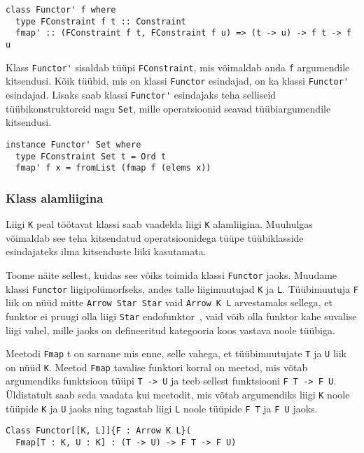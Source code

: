 \documentclass[12pt]{article}
\begin{document}
        \begin{verbatim}class Functor' f where
  type FConstraint f t :: Constraint
  fmap' :: (FConstraint f t, FConstraint f u) => (t -> u) -> f t -> f u\end{verbatim}

        Klass \verb!Functor'! sisaldab tüüpi \verb!FConstraint!, mis võimaldab anda \verb!f! argumendile kitsendusi. Kõik tüübid, mis on klassi \verb!Functor! esindajad, on ka klassi \verb!Functor'! esindajad. Lisaks saab klassi \verb!Functor'! esindajaks teha selliseid tüübikonstruktoreid nagu \verb!Set!, mille operatsioonid seavad tüübiargumendile kitsendusi.

        \begin{verbatim}instance Functor' Set where
  type FConstraint Set t = Ord t
  fmap' f x = fromList (fmap f (elems x))\end{verbatim}
      \subsubsection{Klass alamliigina}
        Liigi \verb!K! peal töötavat klassi saab vaadelda liigi \verb!K! alamliigina. Muuhulgas võimaldab see teha kitsendatud operatsioonidega tüüpe tüübiklasside esindajateks ilma kitsenduste liiki kasutamata.

        Toome näite sellest, kuidas see võiks toimida klassi \verb!Functor! jaoks. Muudame klassi \verb!Functor! liigipolümorfseks, andes talle liigimuutujad \verb!K! ja \verb!L!. Tüübimuutuja \verb!F! liik on nüüd mitte \verb!Arrow Star Star! vaid \verb!Arrow K L! arvestamaks sellega, et funktor ei pruugi olla liigi \verb!Star! endofunktor~\cite{Cat}, vaid võib olla funktor kahe suvalise liigi vahel, mille jaoks on defineeritud kategooria koos vastava noole tüübiga.

        Meetodi \verb!Fmap! t on sarnane mis enne, selle vahega, et tüübimuutujate \verb!T! ja \verb!U! liik on nüüd \verb!K!. Meetod \verb!Fmap! tavalise funktori korral on meetod, mis võtab argumendiks funktsioon tüüpi \verb!T -> U! ja teeb sellest funktsiooni \verb!F T -> F U!. Üldistatult saab seda vaadata kui meetodit, mis võtab argumendiks liigi \verb!K! noole tüüpide \verb!K! ja \verb!U! jaoks ning tagastab liigi \verb!L! noole tüüpide \verb!F T! ja \verb!F U! jaoks.

        \begin{verbatim}Class Functor[[K, L]]{F : Arrow K L}(
  Fmap[T : K, U : K] : (T -> U) -> F T -> F U)\end{verbatim}
\end{document}
